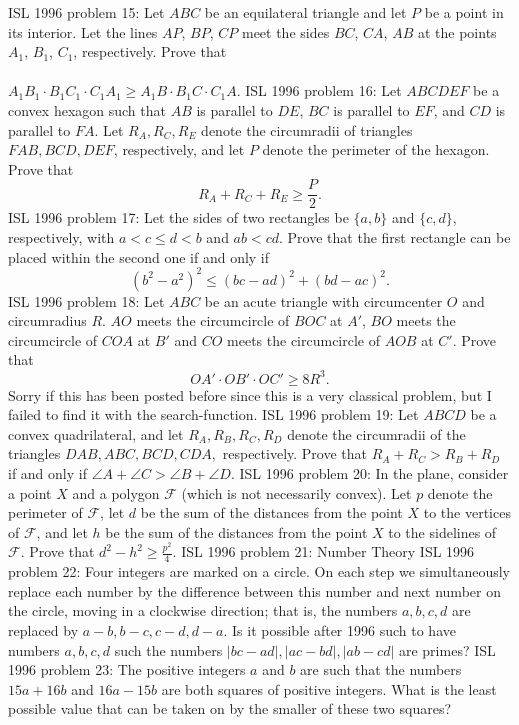 ISL 1996 problem 15:  Let $ABC$ be an equilateral triangle and let $P$ be a point in its interior. Let the lines $AP$, $BP$, $CP$ meet the sides $BC$, $CA$, $AB$ at the points $A_1$, $B_1$, $C_1$, respectively. Prove that \\\\
$A_1B_1 \cdot B_1C_1 \cdot C_1A_1 \ge A_1B \cdot B_1C \cdot C_1A$. 
ISL 1996 problem 16:  Let $ ABCDEF$ be a convex hexagon such that $ AB$ is parallel to  $ DE$, $ BC$ is parallel to $ EF$, and $ CD$ is parallel to $ FA$. Let  $ R_A,R_C,R_E$ denote the circumradii of triangles $ FAB,BCD,DEF$, respectively, and let $ P$ denote the perimeter of the hexagon. Prove that
\[ R_A + R_C + R_E\geq \frac {P}{2}. \] 
ISL 1996 problem 17:  Let the sides of two rectangles be $ \{a,b\}$ and $ \{c,d\},$ respectively, with $ a < c \leq d < b$ and $ ab < cd.$ Prove that the first rectangle can be placed within the second one if and only if
\[ \left(b^2 - a^2\right)^2 \leq \left(bc - ad \right)^2 + \left(bd - ac \right)^2. \] 
ISL 1996 problem 18:  Let $ABC$ be an acute triangle with circumcenter $O$ and circumradius $R$. $AO$ meets the circumcircle of $BOC$ at $A'$, $BO$ meets the circumcircle of $COA$ at $B'$ and $CO$ meets the circumcircle of $AOB$ at $C'$. Prove that
\[ OA'\cdot OB'\cdot OC'\geq 8R^3. \]
Sorry if this has been posted before since this is a very classical problem, but I failed to find it with the search-function. 
ISL 1996 problem 19:  Let $ ABCD$ be a convex quadrilateral, and let $ R_A, R_B, R_C, R_D$ denote the circumradii of the triangles  $ DAB, ABC, BCD, CDA,$ respectively. Prove that $ R_A + R_C > R_B + R_D$ if and only if  $ \angle A + \angle C > \angle B + \angle D.$ 
ISL 1996 problem 20:  In the plane, consider a point $ X$ and a polygon $ \mathcal{F}$ (which is not necessarily convex). Let $ p$ denote the perimeter of $ \mathcal{F}$, let $ d$ be the sum of the distances from the point $ X$ to the vertices of $ \mathcal{F}$, and let $ h$ be the sum of the distances from the point $ X$ to the sidelines of $ \mathcal{F}$. Prove that $ d^2 - h^2\geq\frac {p^2}{4}.$ 
ISL 1996 problem 21:  Number Theory 
ISL 1996 problem 22:  Four integers are marked on a circle. On each step we simultaneously replace each number by the difference between this number and next number on the circle, moving in a clockwise direction; that is, the numbers $ a,b,c,d$ are replaced by $ a-b,b-c,c-d,d-a.$ Is it possible after 1996 such to have numbers $ a,b,c,d$ such the numbers $ |bc-ad|, |ac - bd|, |ab - cd|$ are primes? 
ISL 1996 problem 23:  The positive integers $ a$ and $ b$ are such that the numbers  $ 15a + 16b$ and $ 16a - 15b$ are both squares of positive integers. What is the least possible value that can be taken on by the smaller of these two squares? 
